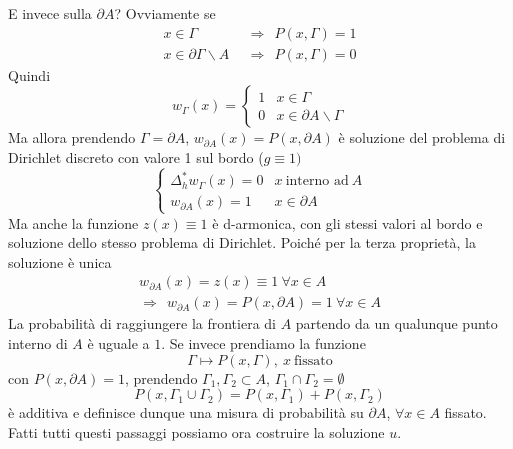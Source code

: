 \documentclass[10pt,a4paper,twoside,openright]{book}
\begin{document}
E invece sulla $\displaystyle \partial A$? Ovviamente se 
\begin{align*}
	x\in \Gamma                       & \ \ \Rightarrow \ \ P(x,\Gamma) =1 \\
	x\in \partial \Gamma \backslash A & \ \ \Rightarrow \ \ P(x,\Gamma) =0 
\end{align*}
Quindi
\begin{equation*}
	w_{\Gamma }(x) =\begin{cases}
	1 & x\in \Gamma \\
	0 & x\in \partial A\backslash \Gamma 
	\end{cases}
\end{equation*}
Ma allora prendendo $\displaystyle \Gamma =\partial A$, $\displaystyle w_{\partial A}(x) =P(x,\partial A)$ è soluzione del problema di Dirichlet discreto con valore 1 sul bordo ($\displaystyle g\equiv 1)$
\begin{equation*}
	\begin{cases}
		\Delta ^{*}_{h} w_{\Gamma }(x) =0 & x\ \text{interno ad} \ A \\
		w_{\partial A}(x) =1              & x\in \partial A          
	\end{cases}
\end{equation*}
Ma anche la funzione $\displaystyle z(x) \equiv 1$ è d-armonica, con gli stessi valori al bordo e soluzione dello stesso problema di Dirichlet. Poiché per la terza proprietà, la soluzione è unica 
\begin{gather*}
	w_{\partial A}(x) =z(x) \equiv 1\ \forall x\in A\\
	\Rightarrow \ \ w_{\partial A}(x) =P(x,\partial A) =1\ \forall x\in A
\end{gather*}
La probabilità di raggiungere la frontiera di $\displaystyle A$ partendo da un qualunque punto interno di $\displaystyle A$ è uguale a $\displaystyle 1$. Se invece prendiamo la funzione
\begin{equation*}
	\Gamma \longmapsto P(x,\Gamma),\ x\ \text{fissato}
\end{equation*}
con $\displaystyle P(x,\partial A) =1$, prendendo $\displaystyle \Gamma _{1},\Gamma _{2} \subset A$, $\displaystyle \Gamma _{1} \cap \Gamma _{2} =\emptyset $
\begin{equation*}
	P( x,\Gamma _{1} \cup \Gamma _{2}) =P(x,\Gamma _{1}) +P(x,\Gamma _{2})
\end{equation*}
è additiva e definisce dunque una misura di probabilità su $\displaystyle \partial A$, $\displaystyle \forall x\in A$ fissato. Fatti tutti questi passaggi possiamo ora costruire la soluzione $\displaystyle u$.
\end{document}
